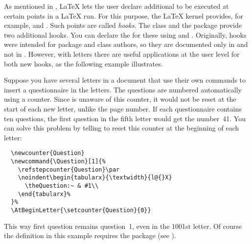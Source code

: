 \begin{Declaration}
\end{Declaration}
As mentioned in \cite{latex:clsguide}, \LaTeX{} lets the user declare
additional  to be executed at certain points in a \LaTeX{} run.
For this purpose, the \LaTeX{} kernel provides, for example,
 and
. Such points are called
\emph{hooks}. The  class and the
 package provide two additional hooks. You can declare the
 for these using  and
. Originally, hooks were
intended for package and class authors, so they are documented only in
\cite{latex:clsguide} and not in \cite{latex:usrguide}. However, with letters
there are useful applications at the user level for both new hooks, as the
following example illustrates.
%
\begin{Example}
  Suppose you have several letters in a document that use their own commands
  to insert a questionnaire in the letters. The questions are numbered
  automatically using a counter. Since \KOMAScript{} is unaware of this
  counter, it would not be reset at the start of each new letter, unlike the
  page number.  If each questionnaire contains ten questions, the first
  question in the fifth letter would get the number~41. You can solve this
  problem by telling \KOMAScript{} to reset this counter at the beginning of
  each letter:
\begin{lstlisting}
  \newcounter{Question}
  \newcommand{\Question}[1]{%
    \refstepcounter{Question}\par
    \noindent\begin{tabularx}{\textwidth}{l@{}X}
      \theQuestion:~ & #1\\
    \end{tabularx}%
  }%
  \AtBeginLetter{\setcounter{Question}{0}}
\end{lstlisting}
  This way first question remains question~1, even in the 1001st letter. Of
  course the definition in this example requires the
   package (see
  \cite{package:tabularx}).
\end{Example}%
%
\EndIndexGroup



